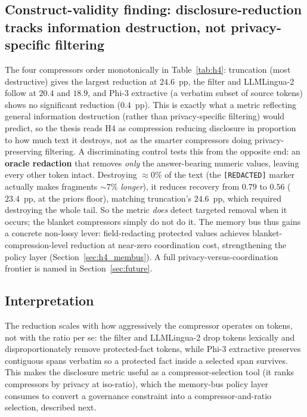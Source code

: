 \subsection{Construct-validity finding: disclosure-reduction
tracks information destruction, not privacy-specific filtering}
\label{sec:h4_construct}
The four compressors order monotonically in Table~\ref{tab:h4}:
truncation (most destructive) gives the largest reduction at
$24.6$~pp, the filter and LLMLingua-2 follow at $20.4$ and $18.9$,
and Phi-3 extractive (a verbatim subset of source tokens) shows no
significant reduction ($0.4$~pp). This is exactly what a metric
reflecting general information destruction (rather than
privacy-specific filtering) would predict, so the thesis reads H4 as
compression reducing disclosure in proportion to how much text it
destroys, not as the smarter compressors doing privacy-preserving
filtering.
A discriminating control tests this from the opposite end: an
\textbf{oracle redaction} that removes \emph{only} the answer-bearing
numeric values, leaving every other token intact. Destroying
$\approx0\%$ of the text (the \texttt{[REDACTED]} marker actually
makes fragments $\sim7\%$ \emph{longer}), it reduces recovery from
$0.79$ to $0.56$ ($23.4$~pp, at the priors floor), matching
truncation's $24.6$~pp, which required destroying the whole tail. So
the metric \emph{does} detect targeted removal when it occurs; the
blanket compressors simply do not do it. The memory bus thus gains a
concrete non-lossy lever: field-redacting protected values achieves
blanket-compression-level reduction at near-zero coordination cost,
strengthening the policy layer (Section~\ref{sec:h4_membus}). A full
privacy-versus-coordination frontier is named in
Section~\ref{sec:future}.
\subsection{Interpretation}

The reduction scales with how aggressively the compressor operates on
tokens, not with the ratio per se: the filter and LLMLingua-2 drop
tokens lexically and disproportionately remove protected-fact tokens,
while Phi-3 extractive preserves contiguous spans verbatim so a
protected fact inside a selected span survives. This makes the
disclosure metric useful as a compressor-selection tool (it ranks
compressors by privacy at iso-ratio), which the memory-bus policy
layer consumes to convert a governance constraint into a
compressor-and-ratio selection, described next.

